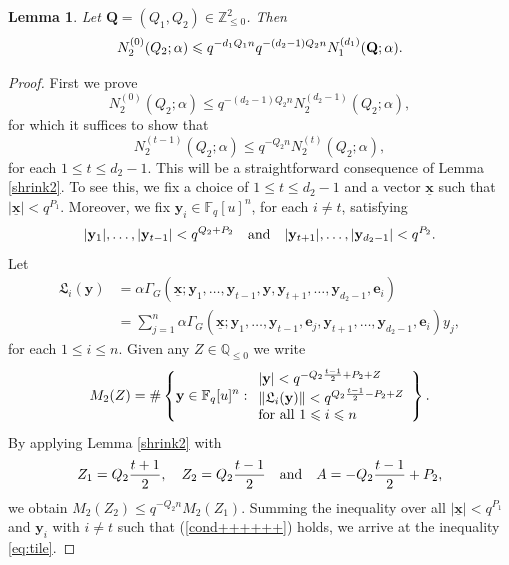 \documentclass[12pt, reqno]{amsart}
\numberwithin{equation}{section}
\newcommand{\0}{\mathbf{0}}
\newcommand{\FF}{\mathbb{F}}
\newcommand{\ZZ}{\mathbb{Z}}
\newcommand{\QQ}{\mathbb{Q}}
\renewcommand{\leq}{\leqslant}
\newcommand{\x}{\mathbf{x}}
\newcommand{\y}{\mathbf{y}}
\renewcommand{\=}{\equiv}
\newcommand{\1}{\mathbf{1}}
\newtheorem{lemma}[theorem]{Lemma}
\theoremstyle{definition}
\begin{document}
\begin{lemma}\label{ineq 1-40}
Let 
$\mathbf{Q}=(Q_1, Q_2) \in \ZZ_{\leq 0}^2$. Then
$$N_2^{(0)}(Q_2; \alpha) \leq
q^{- d_1 Q_1 n} q^{-  (d_2-1) Q_2  n }  N_1^{(d_1)}(\bf Q ; \alpha).
$$
\end{lemma}
\begin{proof}
First we prove
$$
N_2^{(0)}(Q_2; \alpha) \leq q^{ - (d_2-1) Q_2 n  } N_2^{(d_2-1)}(Q_2; \alpha),
$$
for which it 
suffices to show that 
\begin{equation}\label{eq:tile}
N_2^{(t-1)}(Q_2; \alpha) \leq q^{- Q_2 n}  N_2^{(t)}(Q_2; \alpha),
\end{equation}
for each $1 \leq t \leq d_2-1$. This will be a straightforward consequence of Lemma \ref{shrink2}. To see this, we 
fix a choice of  $1 \leq t \leq d_2-1$ and a vector $\underline{\x}$ such that 
 $|\underline{\x}| <  q^{P_1}$. Moreover, we fix 
$\y_i \in \FF_q[u]^n$, for each $i \neq t$, satisfying
\begin{equation}
\label{cond++++++}
|\y_1|,\ldots, |\y_{t-1}| < q^{ Q_2 + P_2}
\quad
\textnormal{and}
\quad
 |\y_{t + 1}|,\ldots, |\y_{d_2-1}| < q^{P_2}.
\end{equation}
Let
\begin{align*}
\mathfrak{L}_{i} (\y)
&=
\alpha  \Gamma_G ( \underline{\x};  \y_{1}, \ldots, \y_{t-1}, \y , \y_{t + 1},  \ldots, \y_{d_2-1}, \mathbf{e}_{i})
\\
&=
\sum_{j = 1}^n \alpha  \Gamma_G ( \underline{\x};  \y_{1}, \ldots, \y_{t-1}, \mathbf{e}_j , \y_{t + 1},  \ldots, \y_{d_2-1}, \mathbf{e}_{i}) y_j,
\end{align*}
for each $1 \leq i \leq n$.
Given any $Z \in \QQ_{\leq 0}$ we write
$$
M_2(Z)  =
\# \left\{
 \y \in  \FF_q[u]^n:
\begin{array}{l}
  |\y | <  q^{ - Q_2 \frac{t - 1 }{2} + P_2 + Z  }  \\
  \|\mathfrak{L}_{i}(\y) \| <   q^{ Q_2 \frac{t - 1 }{2} - P_2 + Z  } \\
 \textnormal{for all $1 \leq i \leq n$}
\end{array}
\right\}.
$$
By applying Lemma \ref{shrink2} with
$$
Z_1 = Q_2 \frac{ t+1 }{2}, \quad Z_2 = Q_2 \frac{t - 1 }{2}
\quad \textnormal{and}
\quad A =  - Q_2 \frac{t - 1 }{2}   + P_2,
$$
we obtain
$
M_2(  Z_2  ) \leq q^{- Q_2 n} M_2(  Z_1  ).
$
Summing the inequality over all
$|\underline{\x}| <  q^{P_1}$ and $\y_{i}$ with $i \neq t$ such that (\ref{cond++++++}) holds,  we arrive at the inequality \eqref{eq:tile}.


\end{proof}
\end{document}
